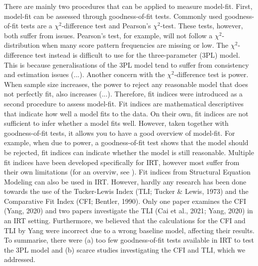 \documentclass[Royal,sageapa,times,doublespace]{sagej}
\begin{document}
\indent There are mainly two procedures that can be applied to measure model-fit. First, model-fit can be assessed through goodness-of-fit tests. Commonly used goodness-of-fit tests are a $\chi^2$-difference test and Pearson's $\chi^2$-test. These tests, however, both suffer from issues. Pearson's test, for example, will not follow a $\chi^2$-distribution when many score pattern frequencies are missing or low. The $\chi^2$-difference test instead is difficult to use for the three-parameter (3PL) model. This is because generalisations of the 3PL model tend to suffer from consistency and estimation issues (...). Another concern with the $\chi^2$-difference test is power. When sample size increases, the power to reject any reasonable model that does not perfectly fit, also increases (...). Therefore, fit indices were introduced as a second procedure to assess model-fit. Fit indices are mathematical descriptives that indicate how well a model fits to the data. On their own, fit indices are not sufficient to infer whether a model fits well. However, taken together with goodness-of-fit tests, it allows you to have a good overview of model-fit. For example, when due to power, a goodness-of-fit test shows that the model should be rejected, fit indices can indicate whether the model is still reasonable. Multiple fit indices have been developed specifically for IRT, however most suffer from their own limitations (for an overviw, see \cite{ref1}). Fit indices from Structural Equation Modeling can also be used in IRT. However, hardly any research has been done towards the use of the Tucker-Lewis Index (TLI; Tucker \& Lewis, 1973) and the Comparative Fit Index (CFI; Bentler, 1990). Only one paper examines the CFI (Yang, 2020) and two papers investigate the TLI  (Cai et al., 2021; Yang, 2020) in an IRT setting. Furthermore, we believed that the calculations for the CFI and TLI by Yang were incorrect due to a wrong baseline model, affecting their results. To summarise, there were (a) too few goodness-of-fit tests available in IRT to test the 3PL model and (b) scarce studies investigating the CFI and TLI, which we addressed.
\end{document}
